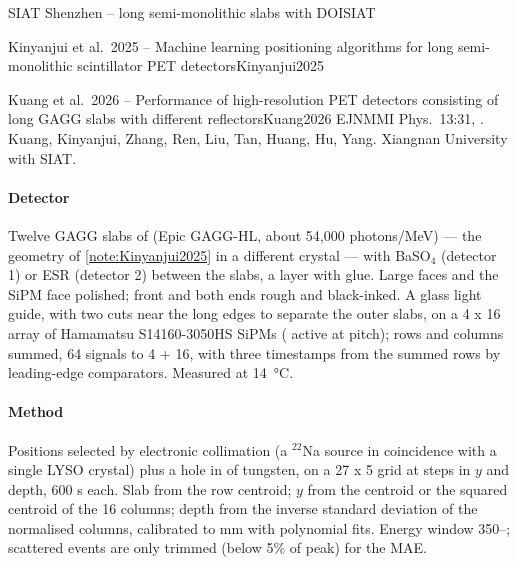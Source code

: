 \begin{programnote}{SIAT Shenzhen -- long semi-monolithic slabs with DOI}{SIAT}
\begin{papernote}{Kinyanjui et al.\ 2025 -- Machine learning positioning algorithms for long semi-monolithic scintillator PET detectors}{Kinyanjui2025}
\end{papernote}

\begin{papernote}{Kuang et al.\ 2026 -- Performance of high-resolution PET detectors consisting of long GAGG slabs with different reflectors}{Kuang2026}
EJNMMI Phys.\ 13:31, . Kuang, Kinyanjui, Zhang,
Ren, Liu, Tan, Huang, Hu, Yang. Xiangnan University with SIAT.

\paragraph{Detector}
Twelve GAGG slabs of  (Epic GAGG-HL, about
54{,}000 photons/MeV) --- the geometry of \ref{note:Kinyanjui2025} in a
different crystal --- with BaSO$_4$ (detector 1) or ESR (detector 2) between
the slabs,  a layer with glue. Large faces and the SiPM face polished;
front and both ends rough and black-inked. A  glass light guide, with
two cuts near the long edges to separate the outer slabs, on a 4 x 16 array of
Hamamatsu S14160-3050HS SiPMs ( active at 
pitch); rows and columns summed, 64 signals to 4 + 16, with three timestamps
from the summed rows by leading-edge comparators. Measured at \qty{14}{\celsius}.

\paragraph{Method}
Positions selected by electronic collimation (a  $^{22}$Na source in
coincidence with a single  LYSO crystal) plus a
 hole in  of tungsten, on a 27 x 5 grid at  steps in $y$ and
depth, 600 s each. Slab from the row centroid; $y$ from the centroid or the
squared centroid of the 16 columns; depth from the inverse standard deviation
of the normalised columns, calibrated to mm with polynomial fits. Energy window
350--; scattered events are only trimmed (below 5\% of peak) for the
MAE.


\end{papernote}
\end{programnote}
